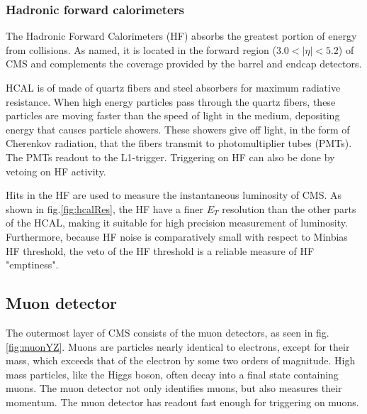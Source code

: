 \subsubsection{Hadronic forward calorimeters}

The Hadronic Forward Calorimeters (HF) absorbs the greatest portion of energy from collisions. As named, it is located in the forward region ($3.0<|\eta| < 5.2 $) of CMS and complements the coverage provided by the barrel and endcap detectors.

HCAL is of made of quartz fibers and steel absorbers for maximum radiative resistance. When high energy particles pass through the quartz fibers, these particles are moving faster than the speed of light in the medium, depositing energy that causes particle showers. These showers give off light, in the form of Cherenkov radiation, that the fibers transmit to photomultiplier tubes (PMTs). The PMTs readout to the L1-trigger. Triggering on HF can also be done by vetoing on HF activity.

Hits in the HF are used to measure the instantaneous luminosity of CMS. As shown in fig.\ref{fig:hcalRes}, the HF have a finer $E_T$ resolution than the other parts of the HCAL, making it suitable for high precision measurement of luminosity. Furthermore, because HF noise is comparatively small with respect to Minbias HF threshold, the veto of the HF threshold is a reliable measure of HF "emptiness". 

\subsection{Muon detector}

The outermost layer of CMS consists of the muon detectors, as seen in fig.\ref{fig:muonYZ}. Muons are particles nearly identical to electrons, except for their mass, which exceeds that of the electron by some two orders of magnitude. High mass particles, like the Higgs boson, often decay into a final state containing muons. The muon detector not only identifies muons, but also measures their momentum. The muon detector has readout fast enough for triggering on muons.

